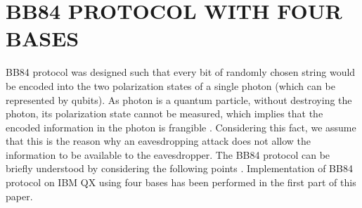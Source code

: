 \documentclass[superscriptaddress,twocolumn,showpacs,prb,floatfix]{revtex4}
\begin{document}
\section{BB84 PROTOCOL WITH FOUR BASES}
\label{SecII}
BB84 protocol was designed such that every bit of randomly chosen string would be encoded into the two polarization states of a single photon (which can be represented by qubits). As photon is a quantum particle, without destroying the photon, its polarization state cannot be measured, which implies that the encoded information in the photon is frangible \cite{QKDL12}. Considering this fact, we assume that this is the reason why an eavesdropping attack does not allow the information to be available to the eavesdropper. The BB84 protocol can be briefly understood by considering the following points \cite{NCCUP2000}. Implementation of BB84 protocol on IBM QX using four bases has been performed in the first part of this paper.
\end{document}
